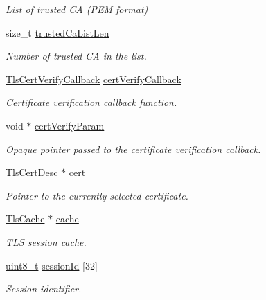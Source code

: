 \begin{DoxyCompactItemize}
\begin{DoxyCompactList}\small\item\em List of trusted CA (P\+EM format) \end{DoxyCompactList}\item 
size\+\_\+t \hyperlink{struct__TlsContext_a5360844cbf77cacbfb368cb9433f9250}{trusted\+Ca\+List\+Len}
\begin{DoxyCompactList}\small\item\em Number of trusted CA in the list. \end{DoxyCompactList}\item 
\hyperlink{tls_8h_a1d220d8b5abc08e3ce8a1278d2aeac5e}{Tls\+Cert\+Verify\+Callback} \hyperlink{struct__TlsContext_ab278e0e4f013057c3590f397611708b9}{cert\+Verify\+Callback}
\begin{DoxyCompactList}\small\item\em Certificate verification callback function. \end{DoxyCompactList}\item 
void $\ast$ \hyperlink{struct__TlsContext_af49da4a70505db68971fdf90c8ce802b}{cert\+Verify\+Param}
\begin{DoxyCompactList}\small\item\em Opaque pointer passed to the certificate verification callback. \end{DoxyCompactList}\item 
\hyperlink{structTlsCertDesc}{Tls\+Cert\+Desc} $\ast$ \hyperlink{struct__TlsContext_a2146ec05ade26ebba710d48057060f5e}{cert}
\begin{DoxyCompactList}\small\item\em Pointer to the currently selected certificate. \end{DoxyCompactList}\item 
\hyperlink{structTlsCache}{Tls\+Cache} $\ast$ \hyperlink{struct__TlsContext_a0de33795f577b764ae96c86400b07425}{cache}
\begin{DoxyCompactList}\small\item\em T\+LS session cache. \end{DoxyCompactList}\item 
\hyperlink{stdint_8h_aba7bc1797add20fe3efdf37ced1182c5}{uint8\+\_\+t} \hyperlink{struct__TlsContext_a8584fd913e0e95d7352ebc127ac76e20}{session\+Id} \mbox{[}32\mbox{]}
\begin{DoxyCompactList}\small\item\em Session identifier. \end{DoxyCompactList}\item 

\end{DoxyCompactItemize}
